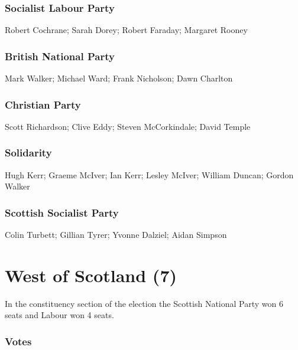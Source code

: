 \begin{resultsiii}
\subsubsection*{Socialist Labour Party}
Robert Cochrane; Sarah Dorey; Robert Faraday; Margaret Rooney
\subsubsection*{British National Party}
Mark Walker; Michael Ward; Frank Nicholson; Dawn Charlton
\subsubsection*{Christian Party}
Scott Richardson; Clive Eddy; Steven McCorkindale; David Temple
\subsubsection*{Solidarity}
Hugh Kerr; Graeme McIver; Ian Kerr; Lesley McIver; William Duncan; Gordon Walker
\subsubsection*{Scottish Socialist Party}
Colin Turbett; Gillian Tyrer; Yvonne Dalziel; Aidan Simpson
\end{resultsiii}

\vfill

\section[West of Scotland]{West of Scotland (7)}

In the constituency section of the election the Scottish National Party won 6 seats and Labour won 4 seats.

\vfill

\subsubsection*{Votes}

